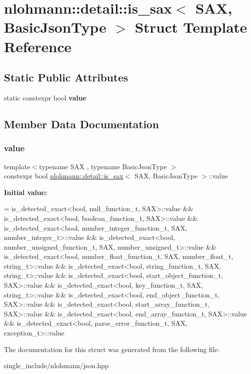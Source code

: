 \hypertarget{structnlohmann_1_1detail_1_1is__sax}{}\section{nlohmann\+:\+:detail\+:\+:is\+\_\+sax$<$ S\+AX, Basic\+Json\+Type $>$ Struct Template Reference}
\label{structnlohmann_1_1detail_1_1is__sax}
\subsection*{Static Public Attributes}
\begin{DoxyCompactItemize}
\item 
static constexpr bool {\bfseries value}
\end{DoxyCompactItemize}


\subsection{Member Data Documentation}
\mbox{\label{structnlohmann_1_1detail_1_1is__sax_a8ab7e51087000e948b4a2492257484dc}} 
\subsubsection{\texorpdfstring{value}{value}}
{\footnotesize\ttfamily template$<$typename S\+AX , typename Basic\+Json\+Type $>$ \\
constexpr bool \hyperlink{structnlohmann_1_1detail_1_1is__sax}{nlohmann\+::detail\+::is\+\_\+sax}$<$ S\+AX, Basic\+Json\+Type $>$\+::value\hspace{0.3cm}{\ttfamily [static]}}

{\bfseries Initial value\+:}
\begin{DoxyCode}
=
        is\_detected\_exact<bool, null\_function\_t, SAX>::value &&
        is\_detected\_exact<bool, boolean\_function\_t, SAX>::value &&
        is\_detected\_exact<bool, number\_integer\_function\_t, SAX,
        number\_integer\_t>::value &&
        is\_detected\_exact<bool, number\_unsigned\_function\_t, SAX,
        number\_unsigned\_t>::value &&
        is\_detected\_exact<bool, number\_float\_function\_t, SAX, number\_float\_t,
        string\_t>::value &&
        is\_detected\_exact<bool, string\_function\_t, SAX, string\_t>::value &&
        is\_detected\_exact<bool, start\_object\_function\_t, SAX>::value &&
        is\_detected\_exact<bool, key\_function\_t, SAX, string\_t>::value &&
        is\_detected\_exact<bool, end\_object\_function\_t, SAX>::value &&
        is\_detected\_exact<bool, start\_array\_function\_t, SAX>::value &&
        is\_detected\_exact<bool, end\_array\_function\_t, SAX>::value &&
        is\_detected\_exact<bool, parse\_error\_function\_t, SAX, exception\_t>::value
\end{DoxyCode}


The documentation for this struct was generated from the following file\+:\begin{DoxyCompactItemize}
\item 
single\+\_\+include/nlohmann/json.\+hpp\end{DoxyCompactItemize}
